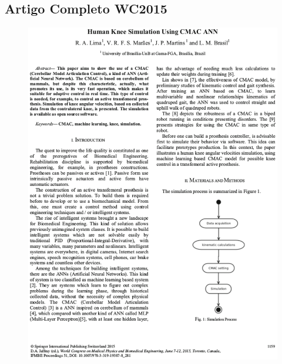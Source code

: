 \begin{apendicesenv}

\partapendices

\chapter{Artigo Completo WC2015}

	\begin{figure}[ht]
		\centering
		\includegraphics[width=17cm]{figuras/wc201501.eps}
	\label{wc201501}
	\end{figure}
	\begin{figure}[ht]
		\centering

\end{figure}
\end{apendicesenv}

